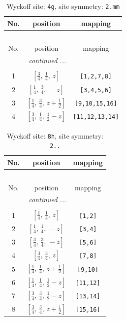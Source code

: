 \documentclass[fleqn,8pt]{jsarticle}
\begin{document}
\renewcommand{\arraystretch}{1.2}
\begin{longtable}{ccc}
\caption{Wyckoff site: {\tt 4g}, site symmetry: {\tt 2.mm}}
 \\
 \hline \hline
No. & position & mapping \\ \hline \endfirsthead

\multicolumn{2}{l}{\tablename\ \thetable{}} \\
 \hline \hline
No. & position & mapping \\ \hline \endhead

 \hline \hline
\multicolumn{2}{r}{\footnotesize\it continued ...} \\ \endfoot

 \hline \hline
\multicolumn{2}{r}{} \\ \endlastfoot

1 & $\left[ \frac{3}{4},\, \frac{1}{4},\, z \right]$ & {\tt [1,2,7,8]} \\ \hline
2 & $\left[ \frac{1}{4},\, \frac{3}{4},\, - z \right]$ & {\tt [3,4,5,6]} \\ \hline
3 & $\left[ \frac{1}{4},\, \frac{3}{4},\, z + \frac{1}{2} \right]$ & {\tt [9,10,15,16]} \\ \hline
4 & $\left[ \frac{3}{4},\, \frac{1}{4},\, \frac{1}{2} - z \right]$ & {\tt [11,12,13,14]} \\
\end{longtable}
\renewcommand{\arraystretch}{1.2}
\begin{longtable}{ccc}
\caption{Wyckoff site: {\tt 8h}, site symmetry: {\tt 2..}}
 \\
 \hline \hline
No. & position & mapping \\ \hline \endfirsthead

\multicolumn{2}{l}{\tablename\ \thetable{}} \\
 \hline \hline
No. & position & mapping \\ \hline \endhead

 \hline \hline
\multicolumn{2}{r}{\footnotesize\it continued ...} \\ \endfoot

 \hline \hline
\multicolumn{2}{r}{} \\ \endlastfoot

1 & $\left[ \frac{1}{4},\, \frac{1}{4},\, z \right]$ & {\tt [1,2]} \\ \hline
2 & $\left[ \frac{1}{4},\, \frac{1}{4},\, - z \right]$ & {\tt [3,4]} \\ \hline
3 & $\left[ \frac{3}{4},\, \frac{3}{4},\, - z \right]$ & {\tt [5,6]} \\ \hline
4 & $\left[ \frac{3}{4},\, \frac{3}{4},\, z \right]$ & {\tt [7,8]} \\ \hline
5 & $\left[ \frac{1}{4},\, \frac{1}{4},\, z + \frac{1}{2} \right]$ & {\tt [9,10]} \\ \hline
6 & $\left[ \frac{1}{4},\, \frac{1}{4},\, \frac{1}{2} - z \right]$ & {\tt [11,12]} \\ \hline
7 & $\left[ \frac{3}{4},\, \frac{3}{4},\, \frac{1}{2} - z \right]$ & {\tt [13,14]} \\ \hline
8 & $\left[ \frac{3}{4},\, \frac{3}{4},\, z + \frac{1}{2} \right]$ & {\tt [15,16]} \\
\end{longtable}
\end{document}
